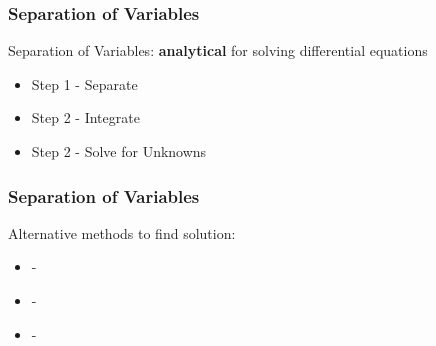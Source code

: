 \documentclass[fleqn]{beamer} %
\newcommand{\sectionIIsubsectionIItitle}{Separation of Variables}
\begin{document}
	
			\begin{frame}

				\frametitle{\sectionIIsubsectionIItitle}
				\bigskip

				Separation of Variables: {\bf analytical} for solving differential equations \vspace{2mm}\\

				\begin{itemize}

					\item Step 1 - Separate\vspace{15mm}\\

					\item Step 2 - Integrate\vspace{15mm}\\
				
					\item Step 2 - Solve for Unknowns\vspace{15mm}\\
				
				\end{itemize}


				\btVFill 
			\end{frame}

			\begin{frame}

				\frametitle{\sectionIIsubsectionIItitle}
				\bigskip

				Alternative methods to find solution:

				\begin{itemize}

					\item - \vspace{10mm}\\

					\item - \vspace{10mm}\\
				
					\item - \vspace{10mm}\\
				
				\end{itemize}


				\btVFill 
			\end{frame}




\end{document}
